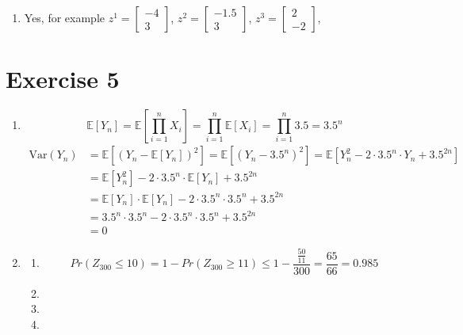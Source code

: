 \documentclass[12pt]{article}
\begin{document}
\begin{enumerate}[label=(\alph*)]
	\item	Yes, for example
			$z^1=\begin{bmatrix} -4 \\ 3 \end{bmatrix}$,
			$z^2=\begin{bmatrix} -1.5 \\ 3 \end{bmatrix}$,
			$z^3=\begin{bmatrix} 2 \\ -2 \end{bmatrix}$,
\end{enumerate}

\section*{Exercise 5}
\begin{enumerate}[label=(\alph*)]
	\item	\[\mathbb{E}[Y_n] = \mathbb{E}[\prod_{i=1}^n X_i] = \prod_{i=1}^n \mathbb{E}[X_i] = \prod_{i=1}^n 3.5 = 3.5^n\]
			\begin{align*}
				\text{Var}(Y_n) &= \mathbb{E}[(Y_n - \mathbb{E}[Y_n])^2] = \mathbb{E}[(Y_n - 3.5^n)^2] = \mathbb{E}[Y_n^2 - 2 \cdot 3.5^n \cdot Y_n + 3.5^{2n}] \\
				&= \mathbb{E}[Y_n^2] - 2 \cdot 3.5^n \cdot \mathbb{E}[Y_n] + 3.5^{2n} \\
				&= \mathbb{E}[Y_n] \cdot \mathbb{E}[Y_n] - 2 \cdot 3.5^n \cdot 3.5^n + 3.5^{2n} \\
				&= 3.5^n \cdot 3.5^n - 2 \cdot 3.5^n \cdot 3.5^n + 3.5^{2n} \\
				&= 0
			\end{align*}
	\item	\begin{enumerate}[label=(\roman*)]
				\item	\[Pr(Z_{300} \leq 10) = 1 - Pr(Z_{300} \geq 11) \leq 1 - \frac{\frac{50}{11}}{300} = \frac{65}{66} = 0.985\]
				\item
				\item
				\item
			\end{enumerate}
\end{enumerate}
\end{document}
